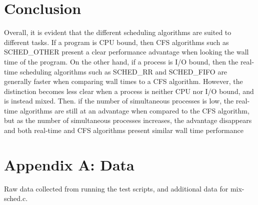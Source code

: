 \documentclass[12pt]{article}
\begin{document}
\section{Conclusion}

Overall, it is evident that the different scheduling algorithms are suited to
different tasks. If a program is CPU bound, then CFS algorithms such as 
{\ttfamily SCHED\_OTHER} present a clear performance advantage when looking the
wall time of the program. On the other hand, if a process is I/O bound, then 
the real-time scheduling algorithms such as {\ttfamily SCHED\_RR} and 
{\ttfamily SCHED\_FIFO} are generally faster when comparing wall times to a 
CFS algorithm. However, the distinction becomes less clear when a process is
neither CPU nor I/O bound, and is instead mixed. Then. if the number of 
simultaneous processes is low, the real-time algorithms are still at an 
advantage when compared to the CFS algorithm, but as the number of simultaneous
processes increases, the advantage disappears and both real-time and CFS 
algorithms present similar wall time performance


\newpage

\section{Appendix A: Data}
Raw data collected from running the test scripts, and additional data for 
{\ttfamily mix-sched.c}.
\end{document}
